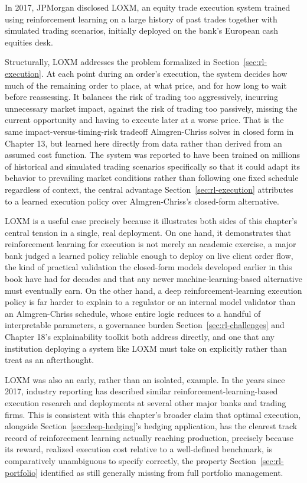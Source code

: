 \documentclass[../ai_in_finance]{subfiles}
\begin{document}
In 2017, JPMorgan disclosed LOXM, an equity trade execution system trained using reinforcement learning on a large history of past trades together with simulated trading scenarios, initially deployed on the bank's European cash equities desk.

Structurally, LOXM addresses the problem formalized in Section~\ref{sec:rl-execution}. At each point during an order's execution, the system decides how much of the remaining order to place, at what price, and for how long to wait before reassessing. It balances the risk of trading too aggressively, incurring unnecessary market impact, against the risk of trading too passively, missing the current opportunity and having to execute later at a worse price. That is the same impact-versus-timing-risk tradeoff Almgren-Chriss solves in closed form in Chapter 13, but learned here directly from data rather than derived from an assumed cost function. The system was reported to have been trained on millions of historical and simulated trading scenarios specifically so that it could adapt its behavior to prevailing market conditions rather than following one fixed schedule regardless of context, the central advantage Section~\ref{sec:rl-execution} attributes to a learned execution policy over Almgren-Chriss's closed-form alternative.

LOXM is a useful case precisely because it illustrates both sides of this chapter's central tension in a single, real deployment. On one hand, it demonstrates that reinforcement learning for execution is not merely an academic exercise, a major bank judged a learned policy reliable enough to deploy on live client order flow, the kind of practical validation the closed-form models developed earlier in this book have had for decades and that any newer machine-learning-based alternative must eventually earn. On the other hand, a deep reinforcement-learning execution policy is far harder to explain to a regulator or an internal model validator than an Almgren-Chriss schedule, whose entire logic reduces to a handful of interpretable parameters, a governance burden Section~\ref{sec:rl-challenges} and Chapter 18's explainability toolkit both address directly, and one that any institution deploying a system like LOXM must take on explicitly rather than treat as an afterthought.

LOXM was also an early, rather than an isolated, example. In the years since 2017, industry reporting has described similar reinforcement-learning-based execution research and deployments at several other major banks and trading firms. This is consistent with this chapter's broader claim that optimal execution, alongside Section~\ref{sec:deep-hedging}'s hedging application, has the clearest track record of reinforcement learning actually reaching production, precisely because its reward, realized execution cost relative to a well-defined benchmark, is comparatively unambiguous to specify correctly, the property Section~\ref{sec:rl-portfolio} identified as still generally missing from full portfolio management.
\end{document}
